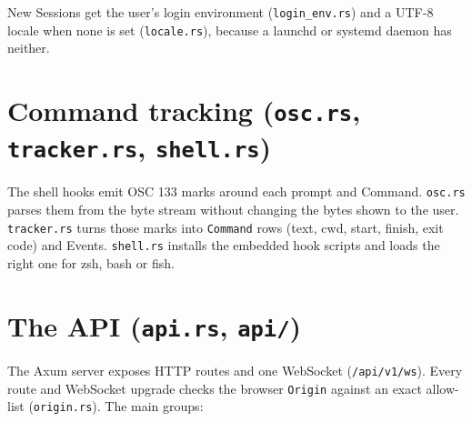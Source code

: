 New Sessions get the user's login environment (\texttt{login\_\allowbreak{}env.\allowbreak{}rs}) and a UTF-8 locale when none is set (\texttt{locale.\allowbreak{}rs}), because a launchd or systemd daemon has neither.

\section{\texorpdfstring{Command tracking (\texttt{osc.\allowbreak{}rs}, \texttt{tracker.\allowbreak{}rs}, \texttt{shell.\allowbreak{}rs})}{Command tracking (osc.rs, tracker.rs, shell.rs)}}

The shell hooks emit OSC 133 marks around each prompt and Command. \texttt{osc.\allowbreak{}rs} parses them from the byte stream without changing the bytes shown to the user. \texttt{tracker.\allowbreak{}rs} turns those marks into \texttt{Command} rows (text, cwd, start, finish, exit code) and Events. \texttt{shell.\allowbreak{}rs} installs the embedded hook scripts and loads the right one for zsh, bash or fish.

\section{\texorpdfstring{The API (\texttt{api.\allowbreak{}rs}, \texttt{api/\allowbreak{}})}{The API (api.rs, api/)}}

The Axum server exposes HTTP routes and one WebSocket (\texttt{/\allowbreak{}api/\allowbreak{}v1/\allowbreak{}ws}). Every route and WebSocket upgrade checks the browser \texttt{Origin} against an exact allow-list (\texttt{origin.\allowbreak{}rs}). The main groups:

